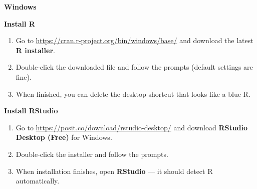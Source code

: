 \documentclass[
  letterpaper,
  DIV=11,
  numbers=noendperiod,
  oneside]{scrreprt}
\providecommand{\tightlist}{%
  \setlength{\itemsep}{0pt}\setlength{\parskip}{0pt}}\usepackage{longtable,booktabs,array}
\begin{document}
\begin{tcolorbox}[enhanced jigsaw, rightrule=.15mm, arc=.35mm, bottomrule=.15mm, leftrule=.75mm, breakable, colframe=quarto-callout-warning-color-frame, left=2mm, toprule=.15mm, opacityback=0, colback=white]

\vspace{-3mm}\textbf{Windows}\vspace{3mm}

\textbf{Install R}

\begin{enumerate}
\def\labelenumi{\arabic{enumi}.}
\tightlist
\item
  Go to \url{https://cran.r-project.org/bin/windows/base/} and download
  the latest \textbf{R installer}.
\item
  Double-click the downloaded file and follow the prompts (default
  settings are fine).
\item
  When finished, you can delete the desktop shortcut that looks like a
  blue R.
\end{enumerate}

\textbf{Install RStudio}

\begin{enumerate}
\def\labelenumi{\arabic{enumi}.}
\tightlist
\item
  Go to \url{https://posit.co/download/rstudio-desktop/} and download
  \textbf{RStudio Desktop (Free)} for Windows.
\item
  Double-click the installer and follow the prompts.
\item
  When installation finishes, open \textbf{RStudio} --- it should detect
  R automatically.
\end{enumerate}

\end{tcolorbox}
\end{document}
